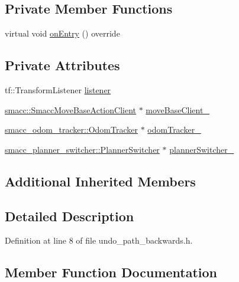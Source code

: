 \subsection*{Private Member Functions}
\begin{DoxyCompactItemize}
\item 
virtual void \hyperlink{classUndoPathBackwards_a073a69a9e7b89d38faaab47096df292c}{on\+Entry} () override
\end{DoxyCompactItemize}
\subsection*{Private Attributes}
\begin{DoxyCompactItemize}
\item 
tf\+::\+Transform\+Listener \hyperlink{classUndoPathBackwards_a482530dc30c268b6c5298b78abfe9d8b}{listener}
\item 
\hyperlink{classsmacc_1_1SmaccMoveBaseActionClient}{smacc\+::\+Smacc\+Move\+Base\+Action\+Client} $\ast$ \hyperlink{classUndoPathBackwards_ac9b783f5d06850fe1c3f03bb1308ca2f}{move\+Base\+Client\+\_\+}
\item 
\hyperlink{classsmacc__odom__tracker_1_1OdomTracker}{smacc\+\_\+odom\+\_\+tracker\+::\+Odom\+Tracker} $\ast$ \hyperlink{classUndoPathBackwards_a7700dd293e08d1383f9e9247329480bc}{odom\+Tracker\+\_\+}
\item 
\hyperlink{classsmacc__planner__switcher_1_1PlannerSwitcher}{smacc\+\_\+planner\+\_\+switcher\+::\+Planner\+Switcher} $\ast$ \hyperlink{classUndoPathBackwards_a88c201f6b358634091afec44002e5f28}{planner\+Switcher\+\_\+}
\end{DoxyCompactItemize}
\subsection*{Additional Inherited Members}


\subsection{Detailed Description}


Definition at line 8 of file undo\+\_\+path\+\_\+backwards.\+h.



\subsection{Member Function Documentation}
